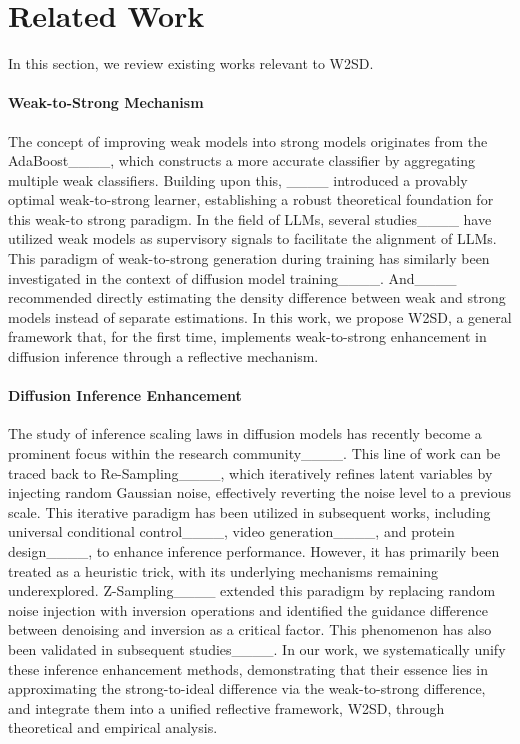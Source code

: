 \section{Related Work}
\label{sec:related_work}
In this section, we review existing works relevant to W2SD.

\paragraph{Weak-to-Strong Mechanism} The concept of improving weak models into strong models originates from the AdaBoost____, which constructs a more accurate classifier by aggregating multiple weak classifiers. Building upon this, ____ introduced a provably optimal weak-to-strong learner, establishing a robust theoretical foundation for this weak-to strong paradigm. In the field of LLMs, several studies____ have utilized weak models as supervisory signals to facilitate the alignment of LLMs. This paradigm of weak-to-strong generation during training has similarly been investigated in the context of diffusion model training____. And____ recommended directly estimating the density difference between weak and strong models instead of separate estimations. In this work, we propose W2SD, a general framework that, for the first time, implements weak-to-strong enhancement in diffusion inference through a reflective mechanism.

\paragraph{Diffusion Inference Enhancement}
The study of inference scaling laws in diffusion models has recently become a prominent focus within the research community____. This line of work can be traced back to Re-Sampling____, which iteratively refines latent variables by injecting random Gaussian noise, effectively reverting the noise level to a previous scale. This iterative paradigm has been utilized in subsequent works, including universal conditional control____, video generation____, and protein design____, to enhance inference performance. However, it has primarily been treated as a heuristic trick, with its underlying mechanisms remaining underexplored. Z-Sampling____ extended this paradigm by replacing random noise injection with inversion operations and identified the guidance difference between denoising and inversion as a critical factor. This phenomenon has also been validated in subsequent studies____. In our work, we systematically unify these inference enhancement methods, demonstrating that their essence lies in approximating the strong-to-ideal difference via the weak-to-strong difference, and integrate them into a unified reflective framework, W2SD, through theoretical and empirical analysis.